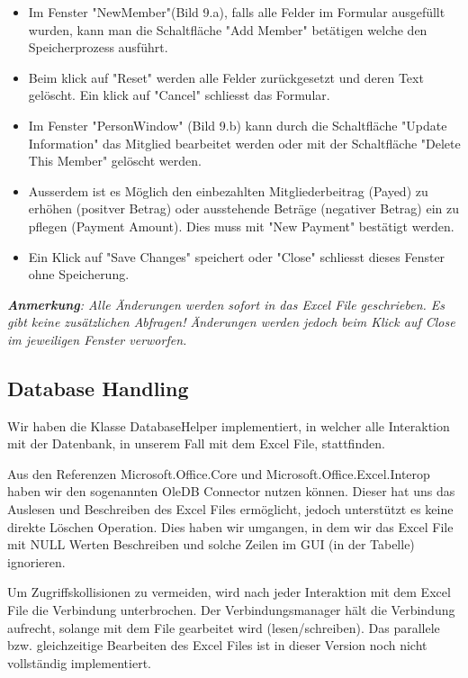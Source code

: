 \documentclass{article}
\begin{document}
 	\begin{itemize}
 	
	\item Im Fenster "NewMember"(Bild 9.a), falls alle Felder im Formular ausgefüllt wurden, kann man die Schaltfläche "Add Member" betätigen welche den Speicherprozess ausführt.
	\item Beim klick auf "Reset" werden alle Felder zurückgesetzt und deren Text gelöscht. Ein klick auf "Cancel" schliesst das Formular.
	
	\vspace{5mm}
	
	 \item Im Fenster "PersonWindow" (Bild 9.b) kann durch die Schaltfläche "Update Information" das Mitglied bearbeitet werden 				oder mit der Schaltfläche "Delete This Member" gelöscht werden.
 \item Ausserdem ist es Möglich den einbezahlten Mitgliederbeitrag (Payed) zu erhöhen (positver Betrag) oder ausstehende Beträge (negativer Betrag) ein zu pflegen (Payment Amount). Dies muss mit "New Payment" bestätigt werden.
 \item Ein Klick auf "Save Changes" speichert oder "Close" schliesst dieses Fenster ohne Speicherung.
 	\end{itemize} 


\vspace{5mm}
\textit{\textbf{Anmerkung}: Alle Änderungen werden sofort in das Excel File geschrieben. Es gibt keine zusätzlichen Abfragen! Änderungen werden jedoch beim Klick auf Close im jeweiligen Fenster verworfen.}

\subsection{Database Handling}
Wir haben die Klasse DatabaseHelper implementiert, in welcher alle Interaktion mit der Datenbank, in unserem Fall mit dem Excel File, stattfinden.

Aus den Referenzen Microsoft.Office.Core und Microsoft.Office.Excel.Interop haben wir den sogenannten OleDB Connector nutzen können. Dieser hat uns das Auslesen und Beschreiben des Excel Files ermöglicht, jedoch unterstützt es keine direkte Löschen Operation. Dies haben wir umgangen, in dem wir das Excel File mit NULL Werten Beschreiben und solche Zeilen im GUI (in der Tabelle) ignorieren.

Um Zugriffskollisionen zu vermeiden, wird nach jeder Interaktion mit dem Excel File die Verbindung unterbrochen. Der Verbindungsmanager hält die Verbindung aufrecht, solange mit dem File gearbeitet wird (lesen/schreiben).
Das parallele bzw. gleichzeitige Bearbeiten des Excel Files ist in dieser Version noch nicht vollständig implementiert.
\end{document}
